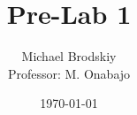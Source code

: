 


\title{Pre-Lab 1}
\date{\today}
\author{Michael Brodskiy\\ \small Professor: M. Onabajo}



\maketitle

